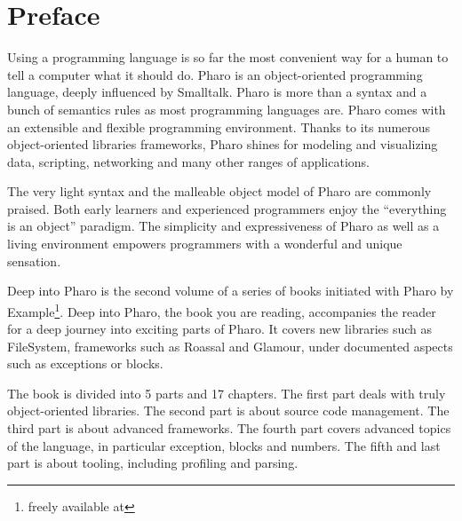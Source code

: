 \documentclass[a4paper,10pt,twoside]{book}
\begin{document}
	\sloppy
	\frontmatter
\fi
\chapter{Preface}

Using a programming language is so far the most convenient way for a human to tell  a computer what it should do. Pharo is an object-oriented programming language, deeply influenced by Smalltalk. Pharo is more than a syntax and a bunch of semantics rules as most programming languages are. Pharo comes with an extensible and flexible programming environment. Thanks to its numerous object-oriented libraries frameworks, Pharo shines for modeling and visualizing data, scripting, networking and many other ranges of applications.

The very light syntax and the malleable object model of Pharo are commonly praised. Both early learners and experienced programmers enjoy the ``everything is an object'' paradigm. The simplicity and expressiveness of Pharo as well as a living environment empowers programmers with a wonderful and unique sensation. 

Deep into Pharo is the second volume of a series of books initiated with Pharo by Example\footnote{freely available at }. 
Deep into Pharo, the book you are reading, accompanies the reader for a deep journey into exciting parts of Pharo. It covers new libraries such as FileSystem, frameworks such as Roassal and Glamour, under documented aspects such as exceptions or blocks. 

The book is divided into 5 parts and 17 chapters. The first part deals with truly object-oriented libraries. The second part is about source code management. The third part is about advanced frameworks. The fourth part covers advanced topics of the language, in particular exception, blocks and numbers. The fifth and last part is about tooling, including profiling and parsing.

\end{document}
